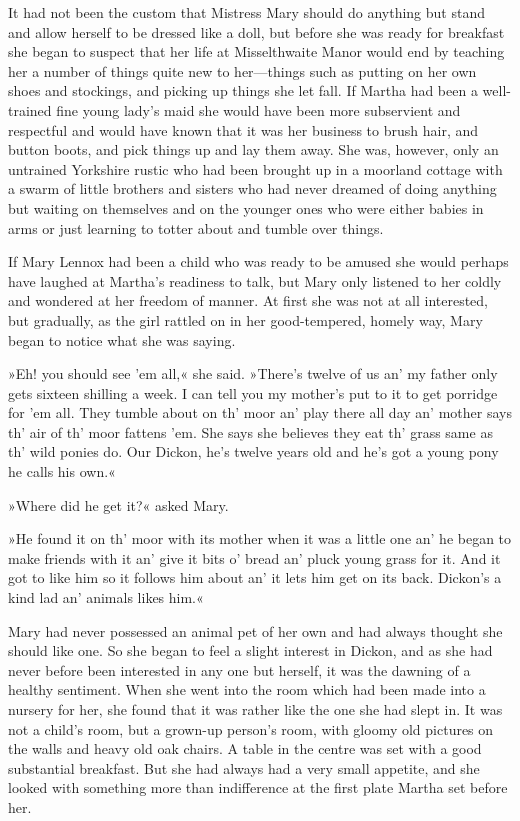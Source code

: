 It had not been the custom that Mistress Mary should do anything but stand and allow herself to be dressed like a doll, but before she was ready for breakfast she began to suspect that her life at Misselthwaite Manor would end by teaching her a number of things quite new to her—things such as putting on her own shoes and stockings, and picking up things she let fall. If Martha had been a well-trained fine young lady's maid she would have been more subservient and respectful and would have known that it was her business to brush hair, and button boots, and pick things up and lay them away. She was, however, only an untrained Yorkshire rustic who had been brought up in a moorland cottage with a swarm of little brothers and sisters who had never dreamed of doing anything but waiting on themselves and on the younger ones who were either babies in arms or just learning to totter about and tumble over things.

If Mary Lennox had been a child who was ready to be amused she would perhaps have laughed at Martha's readiness to talk, but Mary only listened to her coldly and wondered at her freedom of manner. At first she was not at all interested, but gradually, as the girl rattled on in her good-tempered, homely way, Mary began to notice what she was saying.

»Eh! you should see 'em all,« she said. »There's twelve of us an' my father only gets sixteen shilling a week. I can tell you my mother's put to it to get porridge for 'em all. They tumble about on th' moor an' play there all day an' mother says th' air of th' moor fattens 'em. She says she believes they eat th' grass same as th' wild ponies do. Our Dickon, he's twelve years old and he's got a young pony he calls his own.«

»Where did he get it?« asked Mary.

»He found it on th' moor with its mother when it was a little one an' he began to make friends with it an' give it bits o' bread an' pluck young grass for it. And it got to like him so it follows him about an' it lets him get on its back. Dickon's a kind lad an' animals likes him.«

Mary had never possessed an animal pet of her own and had always thought she should like one. So she began to feel a slight interest in Dickon, and as she had never before been interested in any one but herself, it was the dawning of a healthy sentiment. When she went into the room which had been made into a nursery for her, she found that it was rather like the one she had slept in. It was not a child's room, but a grown-up person's room, with gloomy old pictures on the walls and heavy old oak chairs. A table in the centre was set with a good substantial breakfast. But she had always had a very small appetite, and she looked with something more than indifference at the first plate Martha set before her.

